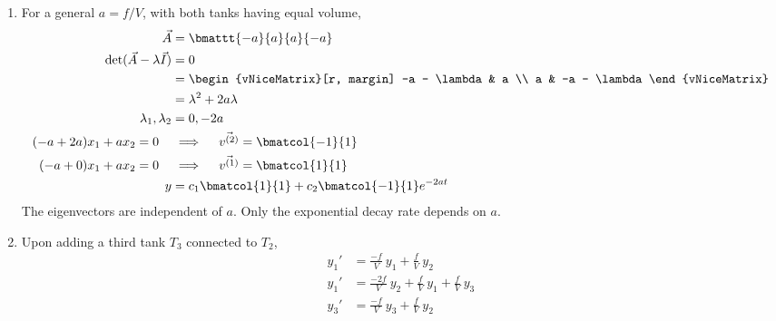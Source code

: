 \begin{enumerate}
    \item For a general $ a = f/V $, with both tanks having equal volume,
          \begin{align}
              \vec{A}                         & = \bmattt{-a}{a}{a}{-a}         \\
              \det(\vec{A} - \lambda \vec{I}) & = 0                             \\
                                              & = \begin{vNiceMatrix}[r, margin]
                                                      -a - \lambda & a            \\
                                                      a            & -a - \lambda
                                                  \end{vNiceMatrix} \\
                                              & = \lambda^{2} + 2a\lambda       \\
              \lambda_1, \lambda_2            & = 0, -2a                        \\
              (-a + 2a)x_1 + a x_2 = 0 \quad  & \implies
              \quad \vec{v^{(2)}} = \bmatcol{-1}{1}                             \\
              (-a + 0)x_1 + a x_2 = 0 \quad   & \implies
              \quad \vec{v^{(1)}} = \bmatcol{1}{1}                              \\
              y                               & = c_1 \bmatcol{1}{1} +
              c_2 \bmatcol{-1}{1}e^{-2at}
          \end{align}
          The eigenvectors are independent of $ a $. Only the exponential decay rate
          depends on $ a $.

    \item Upon adding a third tank $ T_3 $ connected to $ T_2 $,
          \begin{align}
              y_1' & = \frac{-f}{V}\ y_1 + \frac{f}{V}\ y_2                      \\
              y_1' & = \frac{-2f}{V}\ y_2 + \frac{f}{V}\ y_1  + \frac{f}{V}\ y_3 \\
              y_3' & = \frac{-f}{V}\ y_3 + \frac{f}{V}\ y_2                      \\
          \end{align}


\end{enumerate}
